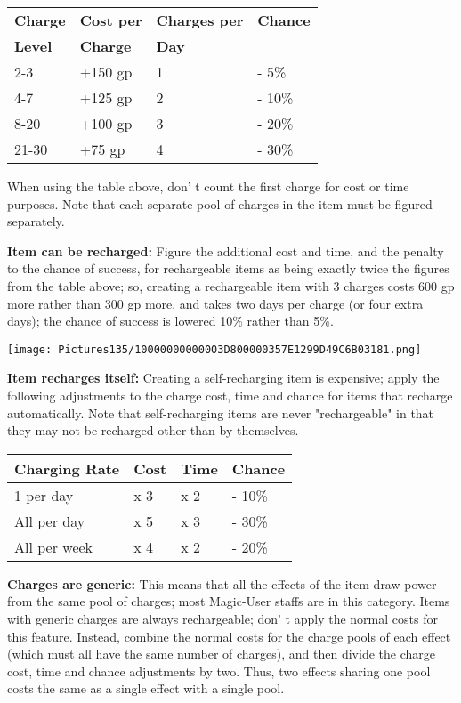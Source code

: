 \documentclass[a4paper,twoside,openany,10pt]{book}
\begin{document}
\begin{multicols}{2}
\begin{tabular*}{0.93\linewidth}{@{\extracolsep{\fill}}llll}
\textbf{Charge} & \textbf{Cost per} & \textbf{Charges per} & \textbf{Chance} \\
\textbf{Level} & \textbf{Charge} & \textbf{Day} &  \\\toprule
2-3 & +150 gp & 1 & - 5\% \\\hline
4-7 & +125 gp & 2 & - 10\% \\\hline
8-20 & +100 gp & 3 & - 20\% \\\hline
21-30 & +75 gp & 4 & - 30\% \\\bottomrule
\end{tabular*}\medskip

When using the table above, don' t count the first charge for cost or time purposes. Note that each separate pool of charges in the item must be figured separately.

\textbf{Item can be recharged:} Figure the additional cost and time, and the penalty to the chance of success, for rechargeable items as being exactly twice the figures from the table above; so, creating a rechargeable item with 3 charges costs 600 gp more rather than 300 gp more, and takes two days per charge (or four extra days); the chance of success is lowered 10\% rather than 5\%.

\begin{center}
	\texttt{[image: Pictures135/10000000000003D800000357E1299D49C6B03181.png]}
\end{center}

\textbf{Item recharges itself:} Creating a self-recharging item is expensive; apply the following adjustments to the charge cost, time and chance for items that recharge automatically. Note that self-recharging items are never "rechargeable" in that they may not be recharged other than by themselves.\medskip

\begin{tabular*}{0.93\linewidth}{@{\extracolsep{\fill}}llll}

\textbf{Charging Rate} & \textbf{Cost} & \textbf{Time} & \textbf{Chance} \\\toprule
1 per day & x 3 & x 2 & - 10\% \\\hline
All per day & x 5 & x 3 & - 30\% \\\hline
All per week & x 4 & x 2 & - 20\% \\\bottomrule
\end{tabular*}\medskip

\textbf{Charges are generic:} This means that all the effects of the item draw power from the same pool of charges; most Magic-User staffs are in this category. Items with generic charges are always rechargeable; don' t apply the normal costs for this feature. Instead, combine the normal costs for the charge pools of each effect (which must all have the same number of charges), and then divide the charge cost, time and chance adjustments by two. Thus, two effects sharing one pool costs the same as a single effect with a single pool. 


\end{multicols}
\end{document}
